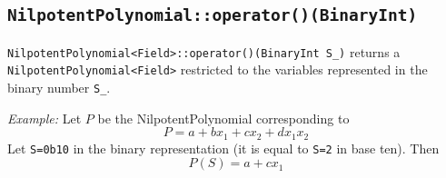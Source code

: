 \subsection{\texttt{NilpotentPolynomial::operator()(BinaryInt)}}
\texttt{NilpotentPolynomial<Field>::operator()(BinaryInt S\_)} returns a \texttt{NilpotentPolynomial<Field>} restricted to the variables represented in the binary number \texttt{S\_}.

{\it Example:}
Let $P$ be the NilpotentPolynomial corresponding to
$$
P = a+b x_1 +c x_2 +d x_1 x_2
$$
Let \texttt{S=0b10} in the binary representation (it is equal to \texttt{S=2} in base ten). Then
$$
P(S) = a + c x_1
$$
